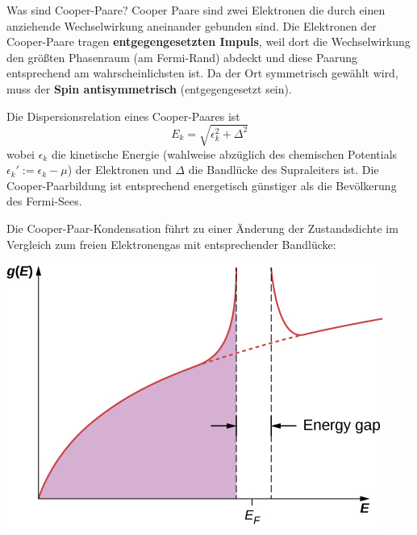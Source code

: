 \begin{fquestion}{Was sind Cooper-Paare?}
    Cooper Paare sind zwei Elektronen die durch einen anziehende Wechselwirkung aneinander gebunden sind.
    Die Elektronen der Cooper-Paare tragen \textbf{entgegengesetzten Impuls}, weil dort die Wechselwirkung den größten Phasenraum (am Fermi-Rand) abdeckt und diese Paarung entsprechend am wahrscheinlichsten ist.
    Da der Ort symmetrisch gewählt wird, muss der \textbf{Spin antisymmetrisch} (entgegengesetzt sein).
    
    Die Dispersionsrelation eines Cooper-Paares ist 
    \[ E_k = \sqrt{\epsilon_k^2 + \Delta^2}\]
    wobei $\epsilon_k$ die kinetische Energie (wahlweise abzüglich des chemischen Potentials $\epsilon_k' := \epsilon_k - \mu$) der Elektronen und $\Delta$ die Bandlücke des Supraleiters ist.
    Die Cooper-Paarbildung ist entsprechend energetisch günstiger als die Bevölkerung des Fermi-Sees.
    
    Die Cooper-Paar-Kondensation führt zu einer Änderung der Zustandsdichte im Vergleich zum freien Elektronengas mit entsprechender Bandlücke:
    \begin{center}
        \includegraphics[width=0.5\linewidth]{img/CNX_UPhysics_42_08_EnergyGap-1.jpg}
    \end{center}
\end{fquestion}


